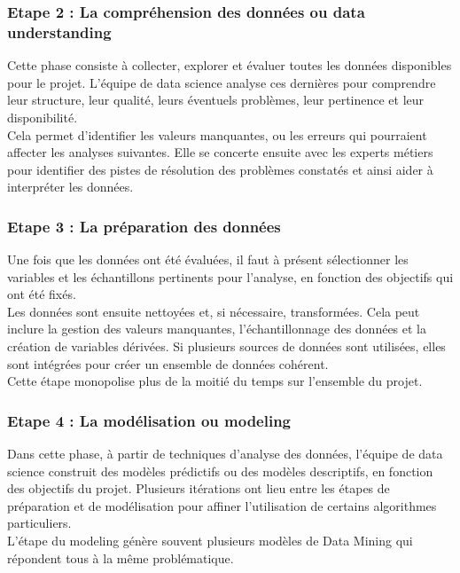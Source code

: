 \documentclass[a4paper,12pt]{report}
\begin{document}
            \subsubsection{Etape 2 : La compréhension des données ou data understanding}
            Cette phase consiste à collecter, explorer et évaluer toutes les données disponibles pour le projet. L'équipe de data science analyse ces dernières pour comprendre leur structure, leur qualité, leurs éventuels problèmes, leur pertinence et leur disponibilité. \\
            Cela permet d’identifier les valeurs manquantes, ou les erreurs qui pourraient affecter les analyses suivantes. Elle se concerte ensuite avec les experts métiers pour identifier des pistes de résolution des problèmes constatés et ainsi aider à interpréter les données.
    
            
            \subsubsection{Etape 3 : La préparation des données}
            Une fois que les données ont été évaluées, il faut à présent sélectionner les variables et les échantillons pertinents pour l’analyse, en fonction des objectifs qui ont été fixés.\\ 
            Les données sont ensuite nettoyées et, si nécessaire, transformées. Cela peut inclure la gestion des valeurs manquantes, l'échantillonnage des données et la création de variables dérivées. Si plusieurs sources de données sont utilisées, elles sont intégrées pour créer un ensemble de données cohérent.\\ 
            Cette étape monopolise plus de la moitié du temps sur l’ensemble du projet.
            
            \subsubsection{Etape 4 : La modélisation ou modeling}
            Dans cette phase, à partir de techniques d'analyse des données, l’équipe de data science construit des modèles prédictifs ou des modèles descriptifs, en fonction des objectifs du projet. Plusieurs itérations ont lieu entre les étapes de préparation et de modélisation pour affiner l’utilisation de certains algorithmes particuliers. \\
            L’étape du modeling génère souvent plusieurs modèles de Data Mining qui répondent tous à la même problématique.
    
\end{document}
